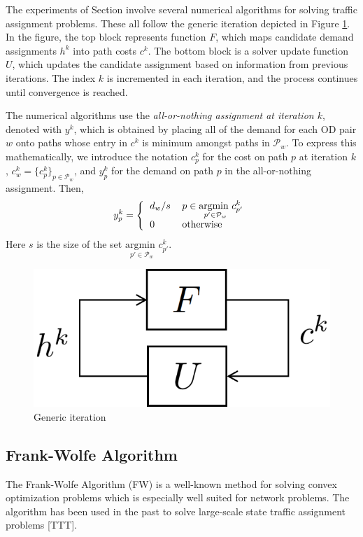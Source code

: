 The experiments of Section \XXX involve several numerical algorithms for solving traffic assignment problems. These all follow the generic iteration depicted in Figure \ref{fig:iteartion}. In the figure, the top block represents function $F$, which maps candidate demand assignments $h^k$ into path costs $c^k$. The bottom block is a solver update function $U$, which updates the candidate assignment based on information from previous iterations. The index $k$ is incremented in each iteration, and the process continues until convergence is reached.

The numerical algorithms use the
\textit{all-or-nothing assignment at iteration $k$}, denoted with $y^k$,
which is obtained by placing all of the demand for each OD pair $w$ onto
paths whose entry in $c^k$ is minimum amongst paths in $\mathcal{P}_w$.
To express this mathematically, we introduce the notation $c^k_p$ for the
cost on path $p$ at iteration $k$, $c^k_w=\{c^k_p\}_{p\in\mathcal{P}_w}$,
and $y^k_p$ for the demand on path $p$ in the all-or-nothing assignment. Then,
\begin{equation}
\label{eq:allornothing}
y^k_p = \left\{
\begin{tabular}{ll}
$d_w/s$ & $p\in\underset{p'\in\mathcal{P}_w}{\text{argmin }} c^k_{p'} $ \\
0 & otherwise
\end{tabular}
\right.
\end{equation}
Here $s$ is the size of the set $\underset{p'\in\mathcal{P}_w}{\text{argmin }} c^k_{p'}$.

\begin{figure}[h]
    \centering
    \includegraphics[width=0.4\linewidth]{figs/iteration.png}
    \caption{Generic iteration}
    \label{fig:iteartion}
\end{figure}

\subsection{Frank-Wolfe Algorithm}

The Frank-Wolfe Algorithm (FW) 
\cite{fukushima1984modified,gartner1977analysis} 
is a well-known method for solving convex optimization problems which is especially well suited for network problems. The algorithm has been used in the past to solve large-scale state traffic assignment problems [TTT].

